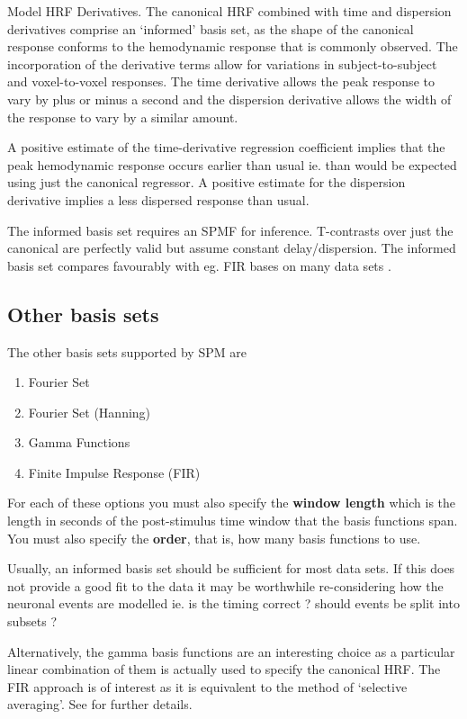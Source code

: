 Model HRF Derivatives. The canonical HRF combined with time and dispersion derivatives comprise an `informed' basis set, as the shape of the canonical response conforms to the hemodynamic response that is commonly observed. The incorporation of the derivative terms allow for variations in subject-to-subject and voxel-to-voxel responses. The time derivative allows the peak response to vary by plus or minus a second and the dispersion derivative allows the width of the response to vary by a similar amount. 

A positive estimate of the time-derivative regression coefficient implies that the peak hemodynamic response occurs earlier than usual ie. than would be expected using just the canonical regressor. A positive estimate for the dispersion derivative implies a less dispersed response than usual.

The informed basis set requires an SPM{F} for inference. T-contrasts over just the canonical are perfectly valid but assume constant delay/dispersion. The informed basis set compares favourably with eg. FIR bases on many data sets \cite{rnah_basis}.

\subsection{Other basis sets}

The other basis sets supported by SPM are

\begin{enumerate}
\item{Fourier Set}
\item{Fourier Set (Hanning)}
\item{Gamma Functions}
\item{Finite Impulse Response (FIR)}
\end{enumerate}

For each of these options you must also specify the {\bf window length} which is the length in seconds of the post-stimulus time window that the basis functions span. You must also specify the {\bf order}, that is, how many basis functions to use.

Usually, an informed basis set should be sufficient for most data sets. If this does not provide a good fit to the data it may be worthwhile re-considering how the neuronal events are modelled ie. is the timing correct ? should events be split into subsets ? 

Alternatively, the gamma basis functions are an interesting choice as a particular linear combination of them is actually used to specify the canonical HRF. The FIR approach is of interest as it is equivalent to the method of `selective averaging'. See \cite{rnah_conv} for further details. 

